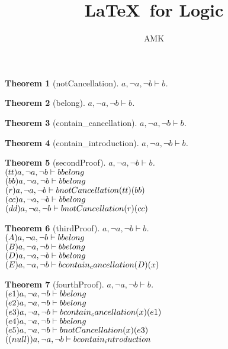 \documentclass[11pt]{article}
\title{\textbf{\LaTeX\ for Logic}}
\author{AMK}
\newtheorem{theorem}{Theorem}
\def\turn{\vdash}
\begin{document}
\maketitle
\begin{theorem}[notCancellation] $ a, \neg a, \neg b \turn b $.\\
\end{theorem}
\begin{theorem}[belong] $ a, \neg a, \neg b \turn b $.\\
\end{theorem}
\begin{theorem}[contain_cancellation] $ a, \neg a, \neg b \turn b $.\\
\end{theorem}
\begin{theorem}[contain_introduction] $ a, \neg a, \neg b \turn b $.\\
\end{theorem}
\begin{theorem}[secondProof] $ a, \neg a, \neg b \turn b $.\\
$(tt)a, \neg a, \neg b \turn b \hfill belong  $\\
$(bb)a, \neg a, \neg b \turn b \hfill belong  $\\
$(r)a, \neg a, \neg b \turn b \hfill notCancellation (tt)(bb) $\\
$(cc)a, \neg a, \neg b \turn b \hfill belong  $\\
$(dd)a, \neg a, \neg b \turn b \hfill notCancellation (r)(cc) $\\
\end{theorem}
\begin{theorem}[thirdProof] $ a, \neg a, \neg b \turn b $.\\
$(A)a, \neg a, \neg b \turn b \hfill belong  $\\
$(B)a, \neg a, \neg b \turn b \hfill belong  $\\
$(D)a, \neg a, \neg b \turn b \hfill belong  $\\
$(E)a, \neg a, \neg b \turn b \hfill contain_cancellation (D)(x) $\\
\end{theorem}
\begin{theorem}[fourthProof] $ a, \neg a, \neg b \turn b $.\\
$(e1)a, \neg a, \neg b \turn b \hfill belong  $\\
$(e2)a, \neg a, \neg b \turn b \hfill belong  $\\
$(e3)a, \neg a, \neg b \turn b \hfill contain_cancellation (x)(e1) $\\
$(e4)a, \neg a, \neg b \turn b \hfill belong  $\\
$(e5)a, \neg a, \neg b \turn b \hfill notCancellation (x)(e3) $\\
$((null))a, \neg a, \neg b \turn b \hfill contain_introduction  $\\
\end{theorem}
\end{document}
